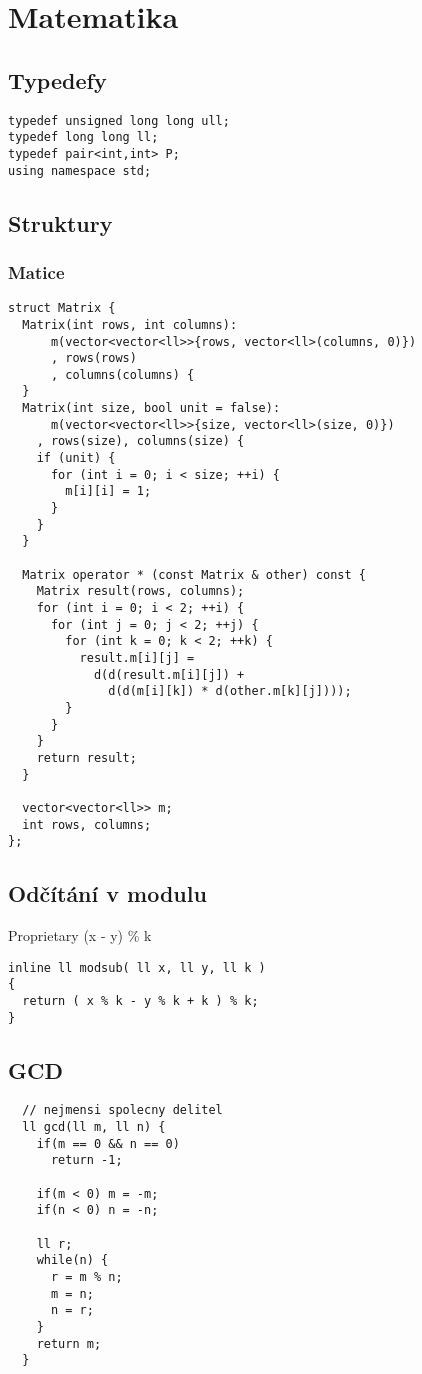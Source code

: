 \documentclass{article}
\begin{document}
\newpage
\section{Matematika}

\subsection{Typedefy}
\begin{lstlisting}
typedef unsigned long long ull;
typedef long long ll;
typedef pair<int,int> P;
using namespace std;
\end{lstlisting}

\subsection{Struktury}
\subsubsection{Matice}
\begin{lstlisting}
struct Matrix {
  Matrix(int rows, int columns):
      m(vector<vector<ll>>{rows, vector<ll>(columns, 0)})
      , rows(rows)
      , columns(columns) {
  }
  Matrix(int size, bool unit = false):
      m(vector<vector<ll>>{size, vector<ll>(size, 0)})
    , rows(size), columns(size) {
    if (unit) {
      for (int i = 0; i < size; ++i) {
        m[i][i] = 1;
      }
    }
  }

  Matrix operator * (const Matrix & other) const {
    Matrix result(rows, columns);
    for (int i = 0; i < 2; ++i) {
      for (int j = 0; j < 2; ++j) {
        for (int k = 0; k < 2; ++k) {
          result.m[i][j] = 
            d(d(result.m[i][j]) + 
              d(d(m[i][k]) * d(other.m[k][j])));
        }
      }
    }
    return result;
  }

  vector<vector<ll>> m;
  int rows, columns;
};
\end{lstlisting}

\subsection{Odčítání v modulu}
Proprietary (x - y) \% k
\begin{lstlisting}
inline ll modsub( ll x, ll y, ll k )
{
  return ( x % k - y % k + k ) % k;
}
\end{lstlisting}

\subsection{GCD}
\begin{lstlisting}
  // nejmensi spolecny delitel
  ll gcd(ll m, ll n) {
    if(m == 0 && n == 0)
      return -1;

    if(m < 0) m = -m;
    if(n < 0) n = -n;

    ll r;
    while(n) {
      r = m % n;
      m = n;
      n = r;
    }
    return m;
  }
\end{lstlisting}
\end{document}
